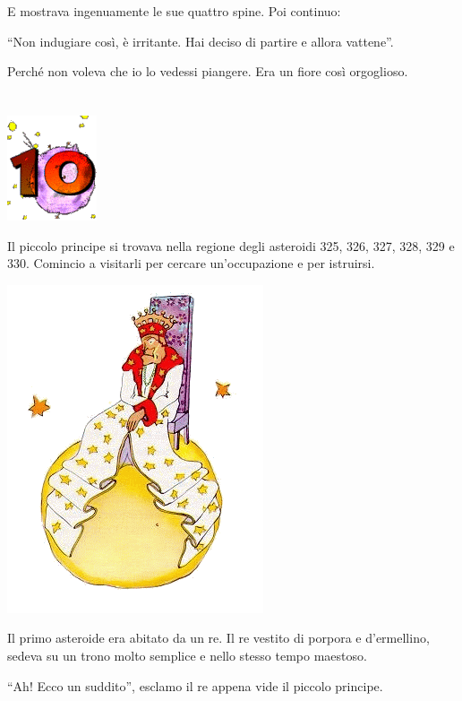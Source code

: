 \documentclass[11pt]{scrbook}
\begin{document}
E mostrava ingenuamente le sue quattro spine. Poi continuo:

``Non indugiare così, è irritante. Hai deciso di partire e allora
vattene''.

Perché non voleva che io lo vedessi piangere. Era un fiore così
orgoglioso.

\chapter{}
\begin{center}
\includegraphics{img/chapter10}
\end{center}

Il piccolo principe si trovava nella regione degli asteroidi 325, 326,
327, 328, 329 e 330. Comincio a visitarli per cercare un'occupazione e
per istruirsi.

\begin{center}
\includegraphics{img/10a}
\end{center}

Il primo asteroide era abitato da un re. Il re vestito di porpora e
d'ermellino, sedeva su un trono molto semplice e nello stesso tempo
maestoso.

``Ah! Ecco un suddito'', esclamo il re appena vide il piccolo principe.
\end{document}
